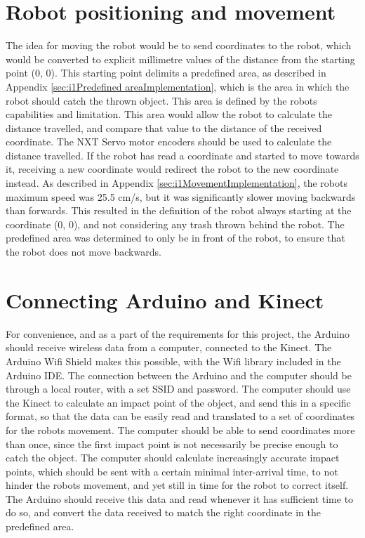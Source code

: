 \section{Robot positioning and movement}
\label{sec:Robot positioning and movement}
The idea for moving the robot would be to send coordinates to the robot, which would be converted to explicit millimetre values of the distance from the starting point (0, 0). This starting point delimits a predefined area, as described in Appendix \ref{sec:i1Predefined areaImplementation}, which is the area in which the robot should catch the thrown object. This area is defined by the robots capabilities and limitation. This area would allow the robot to calculate the distance travelled, and compare that value to the distance of the received coordinate. The NXT Servo motor encoders should be used to calculate the distance travelled. \newline
If the robot has read a coordinate and started to move towards it, receiving a new coordinate would redirect the robot to the new coordinate instead. As described in Appendix \ref{sec:i1MovementImplementation}, the robots maximum speed was 25.5 cm/s, but it was significantly slower moving backwards than forwards. This resulted in the definition of the robot always starting at the coordinate (0, 0), and not considering any trash thrown behind the robot. The predefined area was determined to only be in front of the robot, to ensure that the robot does not move backwards. 

\section{Connecting Arduino and Kinect}
\label{sec:Connecting Arduino and Kinect}
For convenience, and as a part of the requirements for this project, the Arduino should receive wireless data from a computer, connected to the Kinect. The Arduino Wifi Shield makes this possible, with the Wifi library included in the Arduino IDE. \newline
The connection between the Arduino and the computer should be through a local router, with a set SSID and password. The computer should use the Kinect to calculate an impact point of the object, and send this in a specific format, so that the data can be easily read and translated to a set of coordinates for the robots movement. The computer should be able to send coordinates more than once, since the first impact point is not necessarily be precise enough to catch the object. The computer should calculate increasingly accurate impact points, which should be sent with a certain minimal inter-arrival time, to not hinder the robots movement, and yet still in time for the robot to correct itself. \newline
The Arduino should receive this data and read whenever it has sufficient time to do so, and convert the data received to match the right coordinate in the predefined area. 

